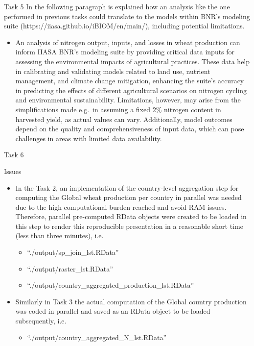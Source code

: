 \documentclass[
  ignorenonframetext,
  aspectratio=169,
]{beamer}
\providecommand{\tightlist}{%
  \setlength{\itemsep}{0pt}\setlength{\parskip}{0pt}}\usepackage{longtable,booktabs,array}
\begin{document}
\begin{frame}{Task 5}
\protect\hypertarget{task-5}{}
In the following paragraph is explained how an analysis like the one
performed in previous tasks could translate to the models within BNR's
modeling suite (https://iiasa.github.io/iBIOM/en/main/), including
potential limitations.

\begin{itemize}[<+->]
\tightlist
\item
  An analysis of nitrogen output, inputs, and losses in wheat production
  can inform IIASA BNR's modeling suite by providing critical data
  inputs for assessing the environmental impacts of agricultural
  practices. These data help in calibrating and validating models
  related to land use, nutrient management, and climate change
  mitigation, enhancing the suite's accuracy in predicting the effects
  of different agricultural scenarios on nitrogen cycling and
  environmental sustainability. Limitations, however, may arise from the
  simplifications made e.g.~in assuming a fixed 2\% nitrogen content in
  harvested yield, as actual values can vary. Additionally, model
  outcomes depend on the quality and comprehensiveness of input data,
  which can pose challenges in areas with limited data availability.
\end{itemize}
\end{frame}

\begin{frame}{Task 6}
\protect\hypertarget{task-6}{}
\begin{block}{Issues}
\protect\hypertarget{issues}{}
\begin{itemize}[<+->]
\item
  In the Task 2, an implementation of the country-level aggregation step
  for computing the Global wheat production per country in parallel was
  needed due to the high computational burden reached and avoid RAM
  issues. Therefore, parallel pre-computed RData objects were created to
  be loaded in this step to render this reproducible presentation in a
  reasonable short time (less than three minutes), i.e.

  \begin{itemize}[<+->]
  \item
    ``./output/sp\_join\_lst.RData''
  \item
    ``./output/raster\_lst.RData''
  \item
    ``./output/country\_aggregated\_production\_lst.RData''
  \end{itemize}
\item
  Similarly in Task 3 the actual computation of the Global country
  production was coded in parallel and saved as an RData object to be
  loaded subsequently, i.e.

  \begin{itemize}[<+->]
  \tightlist
  \item
    ``./output/country\_aggregated\_N\_lst.RData''
  \end{itemize}
\end{itemize}
\end{block}
\end{frame}
\end{document}
